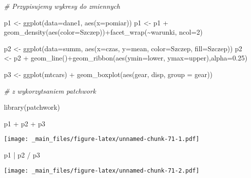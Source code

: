 \documentclass[
]{book}
\newenvironment{Shaded}{\begin{snugshade}}{\end{snugshade}}
\newcommand{\AttributeTok}[1]{\textcolor[rgb]{0.77,0.63,0.00}{#1}}
\newcommand{\CommentTok}[1]{\textcolor[rgb]{0.56,0.35,0.01}{\textit{#1}}}
\newcommand{\DecValTok}[1]{\textcolor[rgb]{0.00,0.00,0.81}{#1}}
\newcommand{\FloatTok}[1]{\textcolor[rgb]{0.00,0.00,0.81}{#1}}
\newcommand{\FunctionTok}[1]{\textcolor[rgb]{0.00,0.00,0.00}{#1}}
\newcommand{\NormalTok}[1]{#1}
\newcommand{\OtherTok}[1]{\textcolor[rgb]{0.56,0.35,0.01}{#1}}
\newcommand{\SpecialCharTok}[1]{\textcolor[rgb]{0.00,0.00,0.00}{#1}}
\begin{document}
\begin{Shaded}
\begin{Highlighting}[]
\CommentTok{\# Przypisujemy wykresy do zmiennych}

\NormalTok{p1 }\OtherTok{\textless{}{-}} \FunctionTok{ggplot}\NormalTok{(}\AttributeTok{data=}\NormalTok{dane1, }\FunctionTok{aes}\NormalTok{(}\AttributeTok{x=}\NormalTok{pomiar))}
\NormalTok{p1 }\OtherTok{\textless{}{-}}\NormalTok{ p1 }\SpecialCharTok{+} \FunctionTok{geom\_density}\NormalTok{(}\FunctionTok{aes}\NormalTok{(}\AttributeTok{color=}\NormalTok{Szczep))}\SpecialCharTok{+}\FunctionTok{facet\_wrap}\NormalTok{(}\SpecialCharTok{\textasciitilde{}}\NormalTok{warunki, }\AttributeTok{ncol=}\DecValTok{2}\NormalTok{)}

\NormalTok{p2 }\OtherTok{\textless{}{-}} \FunctionTok{ggplot}\NormalTok{(}\AttributeTok{data=}\NormalTok{summ, }\FunctionTok{aes}\NormalTok{(}\AttributeTok{x=}\NormalTok{czas, }\AttributeTok{y=}\NormalTok{mean, }\AttributeTok{color=}\NormalTok{Szczep, }\AttributeTok{fill=}\NormalTok{Szczep))}
\NormalTok{p2 }\OtherTok{\textless{}{-}}\NormalTok{ p2 }\SpecialCharTok{+} \FunctionTok{geom\_line}\NormalTok{()}\SpecialCharTok{+}\FunctionTok{geom\_ribbon}\NormalTok{(}\FunctionTok{aes}\NormalTok{(}\AttributeTok{ymin=}\NormalTok{lower, }\AttributeTok{ymax=}\NormalTok{upper),}\AttributeTok{alpha=}\FloatTok{0.25}\NormalTok{)}

\NormalTok{p3 }\OtherTok{\textless{}{-}} \FunctionTok{ggplot}\NormalTok{(mtcars) }\SpecialCharTok{+} \FunctionTok{geom\_boxplot}\NormalTok{(}\FunctionTok{aes}\NormalTok{(gear, disp, }\AttributeTok{group =}\NormalTok{ gear))}

\CommentTok{\# z wykorzytsaniem patchwork}

\FunctionTok{library}\NormalTok{(patchwork)}

\NormalTok{p1 }\SpecialCharTok{+}\NormalTok{ p2 }\SpecialCharTok{+}\NormalTok{ p3}
\end{Highlighting}
\end{Shaded}

\texttt{[image: \_main\_files/figure-latex/unnamed-chunk-71-1.pdf]}

\begin{Shaded}
\begin{Highlighting}[]
\NormalTok{p1 }\SpecialCharTok{|}\NormalTok{ p2 }\SpecialCharTok{/}\NormalTok{ p3}
\end{Highlighting}
\end{Shaded}

\texttt{[image: \_main\_files/figure-latex/unnamed-chunk-71-2.pdf]}
\end{document}
